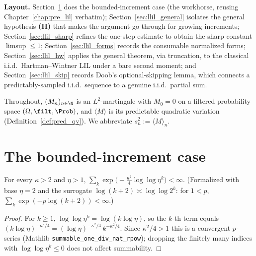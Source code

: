 \medskip
\noindent\textbf{Layout.} Section~\ref{sec:llil_bounded} does the bounded-increment
case (the workhorse, reusing Chapter~\ref{chap:pre_lil} verbatim);
Section~\ref{sec:llil_general} isolates the general hypothesis \textbf{(H)} that makes
the argument go through for growing increments;
Section~\ref{sec:llil_sharp} refines the one-step estimate to obtain the sharp
constant $\limsup\le1$; Section~\ref{sec:llil_forms} records the consumable normalized
forms; Section~\ref{sec:llil_hw} applies the general theorem, via truncation, to the
classical i.i.d.\ Hartman--Wintner LIL under a bare second moment; and
Section~\ref{sec:llil_skip} records Doob's optional-skipping lemma, which connects a
predictably-sampled i.i.d.\ sequence to a genuine i.i.d.\ partial sum.

Throughout, $(M_n)_{n\in\N}$ is an $L^2$-martingale with $M_0=0$ on a filtered
probability space $(\Omega,\filt,\Prob)$, and $\langle M\rangle$ is its predictable
quadratic variation (Definition~\ref{def:pred_qv}). We abbreviate
$s_n^2:=\langle M\rangle_n$.

\section{The bounded-increment case}
\label{sec:llil_bounded}

\begin{lemma}\label{lem:llil_tail_summable}
\leanok
For every $\kappa>2$ and $\eta>1$,
$\sum_{k}\exp\!\big(-\tfrac{\kappa^2}{4}\log\log\eta^k\big)<\infty$. (Formalized with base $\eta=2$
and the surrogate $\log(k+2)\asymp\log\log 2^k$: for $1<p$, $\sum_k\exp(-p\log(k+2))<\infty$.)
\end{lemma}
\begin{proof}\leanok
For $k\ge1$, $\log\log\eta^k=\log(k\log\eta)$, so the $k$-th term equals
$(k\log\eta)^{-\kappa^2/4}=(\log\eta)^{-\kappa^2/4}\,k^{-\kappa^2/4}$. Since
$\kappa^2/4>1$ this is a convergent $p$-series (Mathlib
\texttt{summable\_one\_div\_nat\_rpow}); dropping the finitely many indices with
$\log\log\eta^k\le0$ does not affect summability.
\end{proof}

